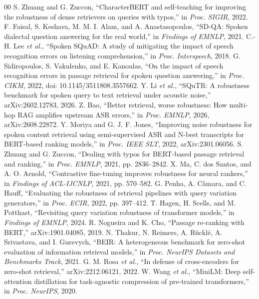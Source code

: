 \documentclass[conference]{IEEEtran}
\begin{document}
\begin{thebibliography}{00}
 S. Zhuang and G. Zuccon, ``CharacterBERT and self-teaching for improving the robustness of dense retrievers on queries with typos,'' in \textit{Proc. SIGIR}, 2022.
 F. Faisal, S. Keshava, M. M. I. Alam, and A. Anastasopoulos, ``SD-QA: Spoken dialectal question answering for the real world,'' in \textit{Findings of EMNLP}, 2021.
 C.-H. Lee \textit{et al.}, ``Spoken SQuAD: A study of mitigating the impact of speech recognition errors on listening comprehension,'' in \textit{Proc. Interspeech}, 2018.
 G. Sidiropoulos, S. Vakulenko, and E. Kanoulas, ``On the impact of speech recognition errors in passage retrieval for spoken question answering,'' in \textit{Proc. CIKM}, 2022, doi: 10.1145/3511808.3557662.
 Y. Li \textit{et al.}, ``SQuTR: A robustness benchmark for spoken query to text retrieval under acoustic noise,'' arXiv:2602.12783, 2026.
 Z. Bao, ``Better retrieval, worse robustness: How multi-hop RAG amplifies upstream ASR errors,'' in \textit{Proc. EMNLP}, 2026, arXiv:2608.22872.
 Y. Moriya and G. J. F. Jones, ``Improving noise robustness for spoken content retrieval using semi-supervised ASR and N-best transcripts for BERT-based ranking models,'' in \textit{Proc. IEEE SLT}, 2022, arXiv:2301.06056.
 S. Zhuang and G. Zuccon, ``Dealing with typos for BERT-based passage retrieval and ranking,'' in \textit{Proc. EMNLP}, 2021, pp. 2836--2842.
 X. Ma, C. dos Santos, and A. O. Arnold, ``Contrastive fine-tuning improves robustness for neural rankers,'' in \textit{Findings of ACL-IJCNLP}, 2021, pp. 570--582.
 G. Penha, A. C\^{a}mara, and C. Hauff, ``Evaluating the robustness of retrieval pipelines with query variation generators,'' in \textit{Proc. ECIR}, 2022, pp. 397--412.
 T. Hagen, H. Scells, and M. Potthast, ``Revisiting query variation robustness of transformer models,'' in \textit{Findings of EMNLP}, 2024.
 R. Nogueira and K. Cho, ``Passage re-ranking with BERT,'' arXiv:1901.04085, 2019.
 N. Thakur, N. Reimers, A. R\"{u}ckl\'{e}, A. Srivastava, and I. Gurevych, ``BEIR: A heterogeneous benchmark for zero-shot evaluation of information retrieval models,'' in \textit{Proc. NeurIPS Datasets and Benchmarks Track}, 2021.
 G. M. Rosa \textit{et al.}, ``In defense of cross-encoders for zero-shot retrieval,'' arXiv:2212.06121, 2022.
 W. Wang \textit{et al.}, ``MiniLM: Deep self-attention distillation for task-agnostic compression of pre-trained transformers,'' in \textit{Proc. NeurIPS}, 2020.

\end{thebibliography}
\end{document}

